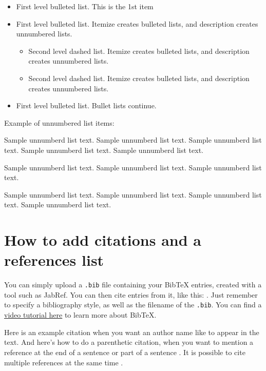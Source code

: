 \documentclass[12pt,a4paper]{article}
\newenvironment{unlist}{%
  \begin{list}{}{%
    \setlength{\labelwidth}{0pt}%
    \setlength{\labelsep}{0pt}%
    \setlength{\leftmargin}{2em}%
    \setlength{\itemindent}{-2em}%
    \setlength{\topsep}{\medskipamount}%
    \setlength{\itemsep}{3pt}%
  }%
}{%
  \end{list}%
}
\begin{document}
\begin{itemize}
\item First level bulleted list. This is the 1st item
\item First level bulleted list. Itemize creates bulleted lists, and description creates unnumbered lists.

\begin{itemize}
\item Second level dashed list. Itemize creates bulleted lists, and description creates unnumbered lists.
\item Second level dashed list. Itemize creates bulleted lists, and description creates unnumbered lists.
\end{itemize}

\item First level bulleted list. Bullet lists continue.
\end{itemize}

\noindent
Example of unnumbered list items:

\begin{unlist}
\item Sample unnumberd list text. Sample unnumberd list text. Sample unnumberd list text. Sample unnumberd list text. Sample unnumberd list text.

\item Sample unnumberd list text. Sample unnumberd list text. Sample unnumberd list text.

\item Sample unnumberd list text. Sample unnumberd list text. Sample unnumberd list text. Sample unnumberd list text. 
\end{unlist}


\section{How to add citations and a references list}

You can simply upload a \verb|.bib| file containing your BibTeX entries, created with a tool such as JabRef. You can then cite entries from it, like this: \textcite{greenwade93}. Just remember to specify a bibliography style, as well as the filename of the \verb|.bib|. You can find a \href{https://www.overleaf.com/help/97-how-to-include-a-bibliography-using-bibtex}{video tutorial here} to learn more about BibTeX.

Here is an example citation when you want an author name like \textcite{collins2011a} to appear in the text. And here's how to do a parenthetic citation, when you want to mention a reference at the end of a sentence or part of a sentence \parencite{collins2013}. It is possible to cite multiple references at the same time \parencite{collins2011b,collins2016,lunn2007a,lunn2007b,ross2006,shannon1948}.
\end{document}
